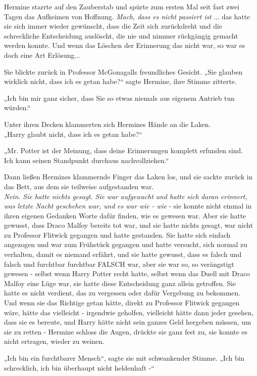 {Hermine starrte auf den Zauberstab und spürte zum ersten Mal seit fast zwei Tagen das Aufkeimen von Hoffnung. \emph{Mach, dass es nicht passiert ist} ... das hatte sie sich immer wieder gewünscht, dass die Zeit sich zurückdreht und die schreckliche Entscheidung auslöscht, die nie und nimmer rückgängig gemacht werden konnte. Und wenn das Löschen der Erinnerung das nicht war, so war es doch eine Art Erlösung...

Sie blickte zurück in Professor McGonagalls freundliches Gesicht. „Sie glauben wirklich nicht, dass ich es getan habe?“ sagte Hermine, ihre Stimme zitterte.

„Ich bin mir ganz sicher, dass Sie so etwas niemals aus eigenem Antrieb tun würden.“

Unter ihren Decken klammerten sich Hermines Hände an die Laken.\\ „Harry glaubt nicht, dass ich es getan habe?“

„Mr. Potter ist der Meinung, dass deine Erinnerungen komplett erfunden sind. Ich kann seinen Standpunkt durchaus nachvollziehen.“

Dann ließen Hermines klammernde Finger das Laken los, und sie sackte zurück in das Bett, aus dem sie teilweise aufgestanden war.\\ \emph{Nein. Sie hatte nichts gesagt. Sie war aufgewacht und hatte sich daran erinnert, was letzte Nacht geschehen war, und es war wie - wie} - sie konnte nicht einmal in ihren eigenen Gedanken Worte dafür finden, wie es gewesen war. Aber sie hatte gewusst, dass Draco Malfoy bereits tot war, und sie hatte nichts gesagt, war nicht zu Professor Flitwick gegangen und hatte gestanden. Sie hatte sich einfach angezogen und war zum Frühstück gegangen und hatte versucht, sich normal zu verhalten, damit es niemand erfährt, und sie hatte gewusst, dass es falsch und falsch und furchtbar furchtbar FALSCH war, aber sie war so, so verängstigt gewesen - selbst wenn Harry Potter recht hatte, selbst wenn das Duell mit Draco Malfoy eine Lüge war, sie hatte diese Entscheidung ganz allein getroffen. Sie hatte es nicht verdient, das zu vergessen oder dafür Vergebung zu bekommen. Und wenn sie das Richtige getan hätte, direkt zu Professor Flitwick gegangen wäre, hätte das vielleicht - irgendwie geholfen, vielleicht hätte dann jeder gesehen, dass sie es bereute, und Harry hätte nicht sein ganzes Geld hergeben müssen, um sie zu retten - Hermine schloss die Augen, drückte sie ganz fest zu, sie konnte es nicht ertragen, wieder zu weinen.

„Ich bin ein furchtbarer Mensch“, sagte sie mit schwankender Stimme. „Ich bin schrecklich, ich bin überhaupt nicht heldenhaft -“

}
